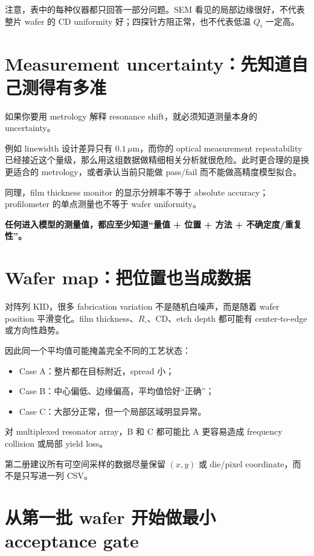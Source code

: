 注意，表中的每种仪器都只回答一部分问题。SEM 看见的局部边缘很好，不代表整片 wafer 的 CD uniformity 好；四探针方阻正常，也不代表低温 $Q_i$ 一定高。

\section{Measurement uncertainty：先知道自己测得有多准}

如果你要用 metrology 解释 resonance shift，就必须知道测量本身的 uncertainty。

例如 linewidth 设计差异只有 $0.1\,\mu$m，而你的 optical measurement repeatability 已经接近这个量级，那么用这组数据做精细相关分析就很危险。此时更合理的是换更适合的 metrology，或者承认当前只能做 pass/fail 而不能做高精度模型拟合。

同理，film thickness monitor 的显示分辨率不等于 absolute accuracy；profilometer 的单点测量也不等于 wafer uniformity。

\begin{center}
\textbf{任何进入模型的测量值，都应至少知道“量值 + 位置 + 方法 + 不确定度/重复性”。}
\end{center}

\section{Wafer map：把位置也当成数据}

对阵列 KID，很多 fabrication variation 不是随机白噪声，而是随着 wafer position 平滑变化。film thickness、$R_\square$、CD、etch depth 都可能有 center-to-edge 或方向性趋势。

因此同一个平均值可能掩盖完全不同的工艺状态：

\begin{itemize}
  \item Case A：整片都在目标附近，spread 小；
  \item Case B：中心偏低、边缘偏高，平均值恰好“正确”；
  \item Case C：大部分正常，但一个局部区域明显异常。
\end{itemize}

对 multiplexed resonator array，B 和 C 都可能比 A 更容易造成 frequency collision 或局部 yield loss。

第二册建议所有可空间采样的数据尽量保留 $(x,y)$ 或 die/pixel coordinate，而不是只写进一列 CSV。

\section{从第一批 wafer 开始做最小 acceptance gate}

